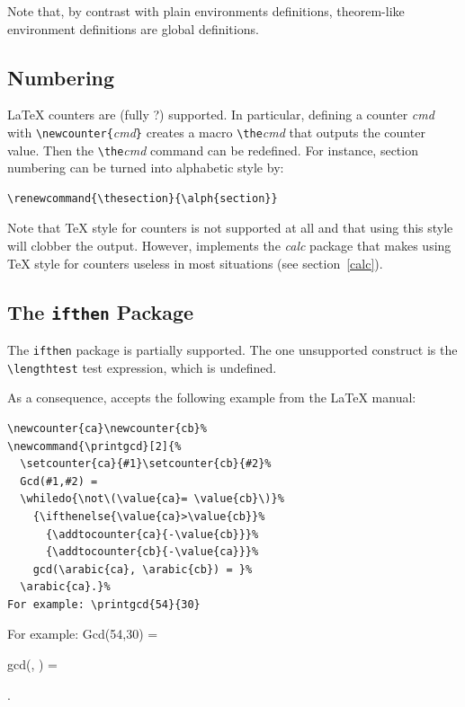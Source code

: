 Note that, by contrast with plain environments definitions,
theorem-like environment definitions are global definitions.

\subsection{Numbering}
\LaTeX{} counters are (fully ?) supported.
In particular, defining a counter \textit{cmd} with
\verb+\newcounter{+\textit{cmd}\verb+}+ creates a macro
\verb+\the+\textit{cmd} that outputs the counter value.
Then the \verb+\the+\textit{cmd} command can be redefined.
For instance, section numbering can be turned into alphabetic style by:
\begin{verbatim}
\renewcommand{\thesection}{\alph{section}}
\end{verbatim}

Note that \TeX{} style for counters is not supported at all and that using
this style will clobber the output. However, \hevea{} implements
the \textit{calc} package that makes using \TeX{} style for counters
useless in most situations (see section~\ref{calc}).


\subsection{The \texttt{ifthen} Package}\label{ifthen}
The \texttt{ifthen} package is partially supported.
The one unsupported construct is the
\verb+\lengthtest+ test expression, which is
undefined.

As a consequence, \hevea{} accepts the following example from the
\LaTeX{} manual:
\begin{verbatim}
\newcounter{ca}\newcounter{cb}%
\newcommand{\printgcd}[2]{%
  \setcounter{ca}{#1}\setcounter{cb}{#2}%
  Gcd(#1,#2) =
  \whiledo{\not\(\value{ca}= \value{cb}\)}%
    {\ifthenelse{\value{ca}>\value{cb}}%
      {\addtocounter{ca}{-\value{cb}}}%
      {\addtocounter{cb}{-\value{ca}}}%
    gcd(\arabic{ca}, \arabic{cb}) = }%
  \arabic{ca}.}%
For example: \printgcd{54}{30}
\end{verbatim}
%
\newcommand{\printgcd}[2]{%
  \setcounter{ca}{#1}\setcounter{cb}{#2}%
  Gcd(#1,#2) =
  \whiledo{\not\(\value{ca}= \value{cb}\)}%
    {\ifthenelse{\value{ca}>\value{cb}}%
      {\addtocounter{ca}{-\value{cb}}}%
      {\addtocounter{cb}{-\value{ca}}}%
    gcd(\arabic{ca}, ) = }%
  .}%
For example: \printgcd{54}{30}

